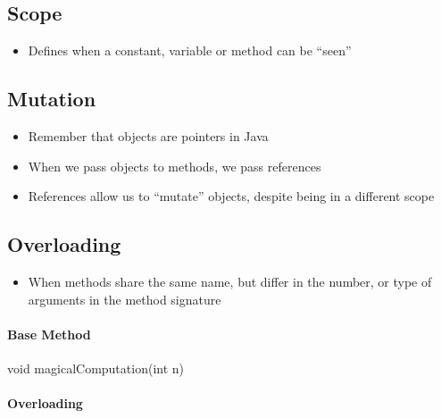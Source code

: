 \documentclass[]{article}
\newenvironment{Shaded}{}{}
\newcommand{\DataTypeTok}[1]{\textcolor[rgb]{0.56,0.13,0.00}{#1}}
\newcommand{\FunctionTok}[1]{\textcolor[rgb]{0.02,0.16,0.49}{#1}}
\newcommand{\NormalTok}[1]{#1}
\providecommand{\tightlist}{%
  \setlength{\itemsep}{0pt}\setlength{\parskip}{0pt}}
\let\oldparagraph\paragraph
\renewcommand{\paragraph}[1]{\oldparagraph{#1}\mbox{}}
\begin{document}
\hypertarget{scope}{%
\subsection{Scope}\label{scope}}

\begin{itemize}
\tightlist
\item
  Defines when a constant, variable or method can be ``seen''
\end{itemize}

\hypertarget{mutation}{%
\subsection{Mutation}\label{mutation}}

\begin{itemize}
\tightlist
\item
  Remember that objects are pointers in Java
\item
  When we pass objects to methods, we pass references
\item
  References allow us to ``mutate'' objects, despite being in a
  different scope
\end{itemize}

\hypertarget{overloading}{%
\subsection{Overloading}\label{overloading}}

\begin{itemize}
\tightlist
\item
  When methods share the same name, but differ in the number, or type of
  arguments in the method signature
\end{itemize}

\hypertarget{base-method}{%
\paragraph{Base Method}\label{base-method}}

\begin{Shaded}
\begin{Highlighting}[]
\DataTypeTok{void} \FunctionTok{magicalComputation}\NormalTok{(}\DataTypeTok{int}\NormalTok{ n)}
\end{Highlighting}
\end{Shaded}

\hypertarget{overloading-1}{%
\paragraph{Overloading}\label{overloading-1}}
\end{document}
